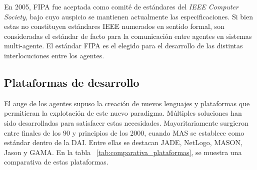 En 2005, FIPA fue aceptada como comité de estándares del \textit{IEEE Computer Society}, bajo cuyo auspicio se mantienen actualmente las especificaciones. Si bien estas no constituyen estándares IEEE numerados en sentido formal, son consideradas  el estándar de facto para la comunicación entre agentes en sistemas multi-agente. El estándar FIPA es el elegido para el desarrollo de las distintas interlocuciones entre los agentes. 

\subsection{Plataformas de desarrollo}
El auge de los agentes supuso la creación de nuevos lenguajes y plataformas que permitieran la explotación de este nuevo paradigma.
Múltiples soluciones han sido desarrolladas para satisfacer estas necesidades. Mayoritariamente surgieron entre finales de los 90 y principios de los 2000, cuando MAS se establece como estándar dentro de la DAI. Entre ellas se destacan JADE\cite{bellifemine2007jade}, NetLogo\cite{wilensky1999netlogo}, MASON\cite{luke2005mason}, Jason\cite{bordini2007jason} y GAMA\cite{taillandier2019gama}. En la tabla ~\ref{tab:comparativa_plataformas}, se muestra una comparativa de estas plataformas.

\begin{table}[h]
\centering
{}
{\small
{}
}%
\end{table}


